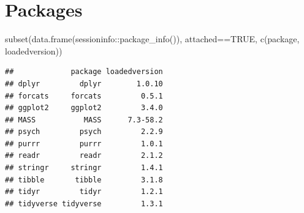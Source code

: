 \documentclass[
]{book}
\newenvironment{Shaded}{\begin{snugshade}}{\end{snugshade}}
\newcommand{\ConstantTok}[1]{\textcolor[rgb]{0.00,0.00,0.00}{#1}}
\newcommand{\FunctionTok}[1]{\textcolor[rgb]{0.00,0.00,0.00}{#1}}
\newcommand{\NormalTok}[1]{#1}
\newcommand{\SpecialCharTok}[1]{\textcolor[rgb]{0.00,0.00,0.00}{#1}}
\begin{document}
\hypertarget{packages-1}{%
\section*{Packages}\label{packages-1}}

\begin{Shaded}
\begin{Highlighting}[]
\FunctionTok{subset}\NormalTok{(}\FunctionTok{data.frame}\NormalTok{(sessioninfo}\SpecialCharTok{::}\FunctionTok{package\_info}\NormalTok{()), attached}\SpecialCharTok{==}\ConstantTok{TRUE}\NormalTok{, }\FunctionTok{c}\NormalTok{(package, loadedversion))}
\end{Highlighting}
\end{Shaded}

\begin{verbatim}
##             package loadedversion
## dplyr         dplyr        1.0.10
## forcats     forcats         0.5.1
## ggplot2     ggplot2         3.4.0
## MASS           MASS      7.3-58.2
## psych         psych         2.2.9
## purrr         purrr         1.0.1
## readr         readr         2.1.2
## stringr     stringr         1.4.1
## tibble       tibble         3.1.8
## tidyr         tidyr         1.2.1
## tidyverse tidyverse         1.3.1
\end{verbatim}

  
\end{document}
